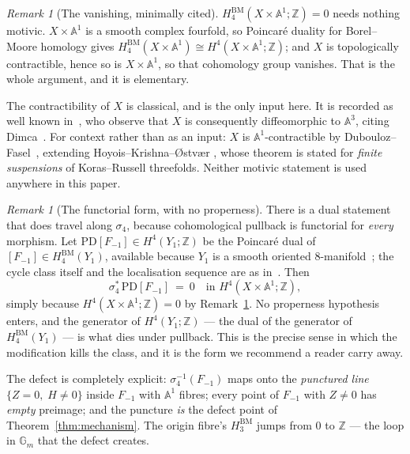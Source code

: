 \documentclass[11pt]{article}
\theoremstyle{definition}
\theoremstyle{remark}
\newtheorem{remark}[theorem]{Remark}
\newcommand{\Z}{\mathbb{Z}}
\newcommand{\Aff}[1]{\mathbb{A}^{#1}}
\newcommand{\Gm}{\mathbb{G}_m}
\newcommand{\HBM}[1]{H^{\mathrm{BM}}_{#1}}
\begin{document}
\begin{remark}[The vanishing, minimally cited]\label{rem:vanishing}
$\HBM{4}(X\times\Aff{1};\Z)=0$ needs nothing motivic. $X\times\Aff{1}$ is a
smooth complex fourfold, so Poincar\'e duality for Borel--Moore homology
\cite[\S2.6]{ChrissGinzburg1997} gives
$\HBM{4}(X\times\Aff{1})\cong H^{4}(X\times\Aff{1};\Z)$; and $X$ is
topologically contractible, hence so is $X\times\Aff{1}$, so that cohomology
group vanishes. That is the whole argument, and it is elementary.

The contractibility of $X$ is classical, and is the only input here. It is
recorded as well known in~\cite[\S1]{DMJP2009}, who observe that $X$ is
consequently diffeomorphic to $\Aff{3}$, citing Dimca~\cite{Dimca1990}. For
context rather than as an input: $X$ is $\Aff{1}$-contractible by
Dubouloz--Fasel~\cite{DF2015}, extending Hoyois--Krishna--{\O}stv{\ae}r
\cite{HKO2014}, whose theorem is stated for \emph{finite suspensions} of
Koras--Russell threefolds. Neither motivic statement is used anywhere in this
paper.
\end{remark}

\begin{remark}[The functorial form, with no properness]\label{rem:functorial}
There is a dual statement that does travel along $\sigma_4$, because
cohomological pullback is functorial for \emph{every} morphism. Let
$\mathrm{PD}[F_{-1}]\in H^{4}(Y_1;\Z)$ be the Poincar\'e dual of
$[F_{-1}]\in\HBM{4}(Y_1)$, available because $Y_1$ is a smooth oriented
$8$-manifold~\cite[\S2.6]{ChrissGinzburg1997}; the cycle class itself and the
localisation sequence are as in~\cite[\S19.1]{Fulton1998}. Then
\[
\sigma_4^{*}\,\mathrm{PD}[F_{-1}]\ =\ 0\quad\text{in } H^{4}(X\times\Aff{1};\Z),
\]
simply because $H^{4}(X\times\Aff{1};\Z)=0$ by Remark~\ref{rem:vanishing}. No
properness hypothesis enters, and the generator of $H^4(Y_1;\Z)$ --- the dual
of the generator of $\HBM{4}(Y_1)$ --- is what dies under pullback. This is the
precise sense in which the modification kills the class, and it is the form we
recommend a reader carry away.
\end{remark}

The defect is completely explicit: $\sigma_4^{-1}(F_{-1})$ maps onto the
\emph{punctured line} $\{Z=0,\;H\ne0\}$ inside $F_{-1}$ with $\Aff{1}$ fibres;
every point of $F_{-1}$ with $Z\ne0$ has \emph{empty} preimage; and the
puncture \emph{is} the defect point of Theorem~\ref{thm:mechanism}. The origin
fibre's $\HBM{3}$ jumps from $0$ to $\Z$ --- the loop in $\Gm$ that the defect
creates.
\end{document}
